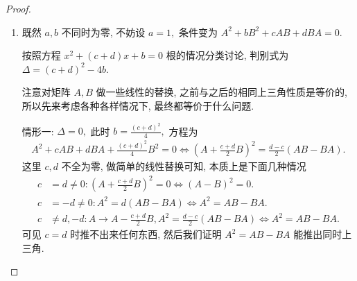 \documentclass[../../main.tex]{subfiles}%
\begin{document}
\begin{proof}
\begin{enumerate}[(1)]
至于反例, 记 \(w = \frac{-1+\sqrt{3}i}{2}\) 是三次单位根, 考虑
\begin{align*}
A = \begin{pmatrix} w & & \\ & w^2 & \\ & & 1 \end{pmatrix}, B = \begin{pmatrix} & & 1 \\ & 1 & \\ 1 & & \end{pmatrix}, w^3=1.
\end{align*}
\begin{align*}
AB = \begin{pmatrix} & & w \\ & w^2 & \\ 1 & & \end{pmatrix}, BA = \begin{pmatrix} w & & \\ & 1 & \\ & & w^2 \end{pmatrix}.
\end{align*}
此时 \(AB=wBA,\) 但是显然 \(A, B\) 没有公共特征向量 (因为 \(A\) 的三个特征向量 \(e_1, e_2, e_3\) 都不是 \(B\) 的特征向量, 并且 \(A\) 是对应着三个一维的特征子空间), 即为反例.

\item 既然 \(a, b\) 不同时为零, 不妨设 \(a=1,\) 条件变为 \(A^2 + bB^2 + cAB + dBA = 0.\)

按照方程 \(x^2+(c+d)x+b=0\) 根的情况分类讨论, 判别式为 \(\Delta = (c+d)^2-4b.\)

注意对矩阵 \(A, B\) 做一些线性的替换, 之前与之后的相同上三角性质是等价的, 所以先来考虑各种各样情况下, 最终都等价于什么问题.

情形一: \(\Delta=0,\) 此时 \(b = \frac{(c+d)^2}{4},\) 方程为
\begin{align*}
A^2 + cAB + dBA + \frac{(c+d)^2}{4}B^2 = 0 \iff \left(A+\frac{c+d}{2}B\right)^2 = \frac{d-c}{2}(AB-BA).
\end{align*}
这里 \(c, d\) 不全为零, 做简单的线性替换可知, 本质上是下面几种情况
\begin{align*}
c &= d \ne 0 : \left(A + \frac{c+d}{2}B\right)^2 = 0 \iff (A-B)^2=0. \\
c &= -d \ne 0 : A^2 = d(AB-BA) \iff A^2 = AB-BA. \\
c &\ne d, -d : A \to A - \frac{c+d}{2}B, A^2 = \frac{d-c}{2}(AB-BA) \iff A^2 = AB-BA.
\end{align*}
可见 \(c=d\) 时推不出来任何东西, 然后我们证明 \(A^2 = AB-BA\) 能推出同时上三角.


\end{enumerate}
\end{proof}
\end{document}

